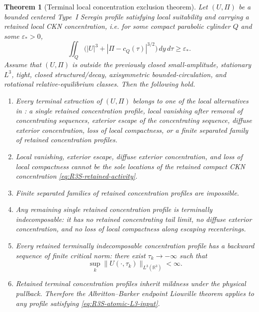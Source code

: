 \documentclass[11pt]{amsart}
\numberwithin{equation}{section}
\theoremstyle{plain}
\newtheorem{theorem}{Theorem}[section]
\theoremstyle{definition}
\theoremstyle{remark}
\begin{document}
\begin{theorem}[Terminal local concentration exclusion theorem]
\label{thm:R3S-terminal-package}
Let \((U,\Pi)\) be a bounded centered Type~I Seregin profile satisfying local
suitability and carrying a retained local CKN concentration, i.e. for some
compact parabolic cylinder \(Q\) and some \(\varepsilon_*>0\),
\begin{equation}\label{eq:R3S-retained-activity}
   \iint_Q\bigl(|U|^3+|\Pi-c_Q(\tau)|^{3/2}\bigr)\,dy\,d\tau
   \ge \varepsilon_* .
\end{equation}
Assume that \((U,\Pi)\) is outside the previously closed small-amplitude,
stationary \(L^3\), tight, closed structured/decay, axisymmetric
bounded-circulation, and rotational relative-equilibrium classes.  Then the
following hold.
\begin{enumerate}[label=(\roman*)]
   \item Every terminal extraction of \((U,\Pi)\) belongs to one of the local
   alternatives in : a single retained
   concentration profile, local vanishing after removal of concentrating
   sequences, exterior escape of the concentrating sequence, diffuse exterior
   concentration, loss of local compactness, or a finite separated family of
   retained concentration profiles.
   \item Local vanishing, exterior escape, diffuse exterior concentration, and
   loss of local compactness cannot be the sole locations of the retained
   compact CKN concentration
   \eqref{eq:R3S-retained-activity}.
   \item Finite separated families of retained concentration profiles are
   impossible.
   \item Any remaining single retained concentration profile is terminally
   indecomposable: it has no retained concentrating tail limit, no diffuse
   exterior concentration, and no loss of local compactness along escaping
   recenterings.
   \item Every retained terminally indecomposable concentration profile has a
   backward sequence of finite critical norm: there exist
   \(\tau_k\to-\infty\) such that
   \begin{equation}\label{eq:R3S-atomic-L3-input}
      \sup_k \|U(\cdot,\tau_k)\|_{L^3(\mathbb R^3)}<\infty .
   \end{equation}
   \item Retained terminal concentration profiles inherit mildness under the
   physical pullback.  Therefore the Albritton--Barker endpoint Liouville theorem
   applies to any profile satisfying \eqref{eq:R3S-atomic-L3-input}.
\end{enumerate}
\end{theorem}
\end{document}

